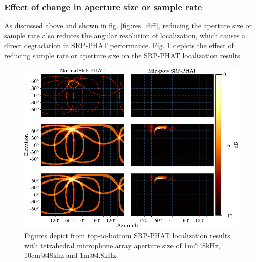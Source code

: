 \subsubsection{Effect of change in aperture size or sample rate}
As discussed above and shown in fig. \ref{fig:res_diff}, reducing the aperture size or sample rate also reduces the angular resolution of localization, which causes a direct degradation in SRP-PHAT performance. Fig. \ref{fig:4mic1srcAper} depicts the effect of reducing sample rate or aperture size on the SRP-PHAT localization results.
\begin{figure}[H]
    \centering
    \includegraphics[width=\textwidth]{Figures/aperSampSim.png}
    \caption{Figures depict from top-to-bottom SRP-PHAT localization results with tetrahedral microphone array aperture size of 1m@48kHz, 10cm@48khz and 1m@4.8kHz.}
    \label{fig:4mic1srcAper}
\end{figure}

